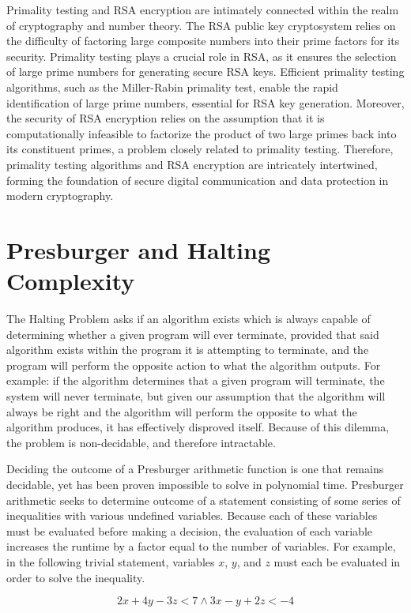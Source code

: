 \documentclass{article}
\renewcommand{\_}{\ifincsname_\else\legacyunderscore\fi}
\begin{document}
Primality testing and RSA encryption are intimately connected within the realm of cryptography and number theory. The RSA public key cryptosystem relies on the difficulty of factoring large composite numbers into their prime factors for its security. Primality testing plays a crucial role in RSA, as it ensures the selection of large prime numbers for generating secure RSA keys. Efficient primality testing algorithms, such as the Miller-Rabin primality test, enable the rapid identification of large prime numbers, essential for RSA key generation. Moreover, the security of RSA encryption relies on the assumption that it is computationally infeasible to factorize the product of two large primes back into its constituent primes, a problem closely related to primality testing. Therefore, primality testing algorithms and RSA encryption are intricately intertwined, forming the foundation of secure digital communication and data protection in modern cryptography. 
\newpage
\section{Presburger and Halting Complexity}

The Halting Problem asks if an algorithm exists which is always capable of determining whether a given program will ever terminate, provided that said algorithm exists within the program it is attempting to terminate, and the program will perform the opposite action to what the algorithm outputs. For example: if the algorithm determines that a given program will terminate, the system will never terminate, but given our assumption that the algorithm will always be right and the algorithm will perform the opposite to what the algorithm produces, it has effectively disproved itself. Because of this dilemma, the problem is non-decidable, and therefore intractable.

Deciding the outcome of a Presburger arithmetic function is one that remains decidable, yet has been proven impossible to solve in polynomial time. Presburger arithmetic seeks to determine outcome of a statement consisting of some series of inequalities with various undefined variables. Because each of these variables must be evaluated before making a decision, the evaluation of each variable increases the runtime by a factor equal to the number of variables. For example, in the following trivial statement, variables $x$, $y$, and $z$ must each be evaluated in order to solve the inequality.

\begin{equation}
    2x+4y-3z < 7 \wedge 3x-y+2z < -4
\end{equation}
\end{document}
